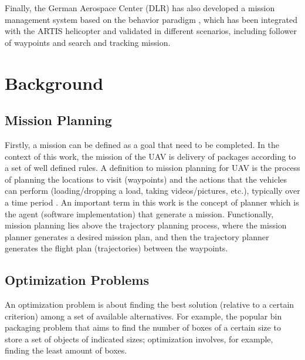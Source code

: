 \documentclass[conference,harvard,brazil,english]{sbatex}
\begin{document}
Finally, the German Aerospace Center (DLR) has also developed a mission management system based on the behavior paradigm \cite{adolf2010onboard}, which has been integrated with the ARTIS helicopter and validated in different scenarios, including follower of waypoints and search and tracking mission.

\section{Background}
\label{sec:background}

\subsection{Mission Planning}
\label{subsec:missionplanning}

Firstly, a mission can be defined as a goal that need to be completed. In the context of this work, the mission of the UAV is delivery of packages according to a set of well defined rules. A definition to mission planning for UAV is the process of planning the locations to visit (waypoints) and the actions that the vehicles can perform (loading/dropping a load, taking videos/pictures, etc.), typically over a time period \cite{ramirez2014solving}. An important term in this work is the concept of planner which is the agent (software implementation) that generate a mission. Functionally, mission planning lies above the trajectory planning process, where the mission planner generates a desired mission plan, and then the trajectory planner generates the flight plan (trajectories) between the waypoints.





\subsection{Optimization Problems}

An optimization problem is about finding the best solution (relative to a certain criterion) among a set of available alternatives. For example, the popular bin packaging problem that aims to find the number of boxes of a certain size to store a set of objects of indicated sizes; optimization involves, for example, finding the least amount of boxes.
\end{document}
